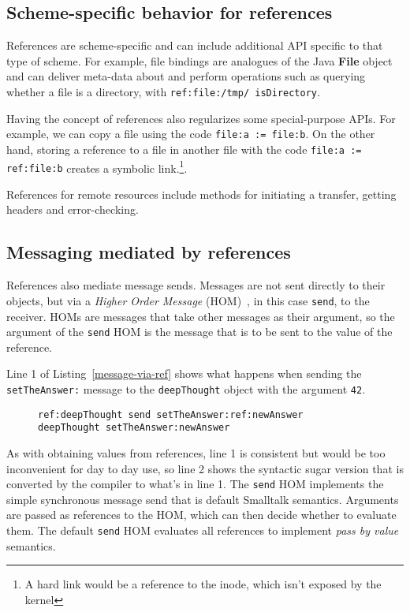 \documentclass[preprint]{sigplanconf}
\begin{document}
\vspace{-2.0em}


\subsection{Scheme-specific behavior for references}

References are scheme-specific and can include additional API specific to that type of scheme.
For example, file bindings are analogues of the Java {\bf File} object and can deliver
meta-data about and perform operations such as querying whether a file is a directory, with
{\tt ref:file:/tmp/ isDirectory}.


Having the concept of references also regularizes some special-purpose APIs.  For example,
we can copy a file using the code {\tt file:a := file:b}.  On the other hand, storing a reference 
to a file in another file with the code {\tt file:a := ref:file:b} creates a symbolic link.\footnote{A hard link
would be a reference to the inode, which isn't exposed by the kernel}.

References for remote resources include methods for initiating a transfer, getting headers and 
error-checking.

\subsection{Messaging mediated by references}

References also mediate message sends.   Messages are not sent directly to their objects, but via a
\emph{Higher Order Message} (HOM)~\cite{HOM}, in this case {\tt send}, to the receiver.    HOMs
are messages that take other messages as their argument, so the argument of the {\tt send} HOM is the
message that is to be sent to the value of the reference.  

  Line 1 of Listing~\ref{message-via-ref} shows
what happens when sending the {\tt setTheAnswer:} message to the {\tt deepThought} object with
the argument {\tt 42}.

\begin{figure}[htbp]
\begin{lstlisting}[style=numbers,label=message-via-ref,caption=Message sending via reference and with syntactic sugar]
ref:deepThought send setTheAnswer:ref:newAnswer
deepThought setTheAnswer:newAnswer
\end{lstlisting}
\end{figure}

As with obtaining values from references, line 1 is consistent but would be too inconvenient for day to day use,
so line 2 shows the syntactic sugar version that is converted by the compiler to what's in line 1.  The {\tt send}
HOM implements the simple synchronous message send that is default Smalltalk semantics.   Arguments
are passed as references to the HOM, which can then decide whether to evaluate them.  The default {\tt send}
HOM evaluates all references to implement \emph{pass by value} semantics.
\end{document}

